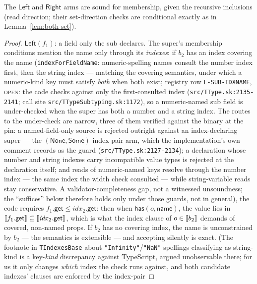 \documentclass[11pt]{article}
\begin{document}
\begin{lemma}
\label{lem:width}
The $\mathsf{Left}$ and $\mathsf{Right}$ arms are sound for membership,
given the recursive inclusions (read direction; their set-direction
checks are conditional exactly as in Lemma~\ref{lem:both-set}).
\end{lemma}
\begin{proof}
$\mathsf{Left}(f_1)$: a field only the sub declares. The super's
membership conditions mention the name only through its \emph{indexes}:
if $b_2$ has an index covering the name
(\texttt{indexForFieldName}: numeric-spelling names consult the number
index first, then the string index --- matching the covering semantics,
under which a numeric-kind key must satisfy \emph{both} when both exist;
registry row \texttt{L-SUB-IDXNAME}, \textsc{open}: the code checks
against only the first-consulted index
(\texttt{src/TType.sk:2135-2141}; call site
\texttt{src/TTypeSubtyping.sk:1172}), so a numeric-named sub field is
under-checked when the super has both a number and a string index. The
routes to the under-check are narrow, three of them verified against
the binary at the pin: a named-field-only source is rejected outright
against an index-declaring super --- the
$(\mathsf{None},\mathsf{Some})$ index-pair arm, which the
implementation's own comment records as the guard
(\texttt{src/TType.sk:2127-2134}); a declaration whose number and
string indexes carry incompatible value types is rejected at the
declaration itself; and reads of numeric-named keys resolve through the
number index --- the same index the width check consulted --- while
string-variable reads stay conservative. A validator-completeness gap,
not a witnessed unsoundness; the ``suffices''
below therefore holds only under those guards, not in general), the code
requires
$f_1.\mathsf{get} \leq \mathit{idx}_2.\mathsf{get}$: then when
$\mathsf{has}(o, \mathsf{name})$, the value lies in
$\llbracket f_1.\mathsf{get} \rrbracket \subseteq \llbracket \mathit{idx}_2.\mathsf{get} \rrbracket$,
which is what the index clause of $o \in \llbracket b_2 \rrbracket$ demands of covered,
non-named props. If $b_2$ has no covering index, the name is
unconstrained by $b_2$ --- the semantics is extensible --- and accepting
silently is exact. (The footnote in \texttt{TIndexesBase} about
\texttt{"Infinity"}/\texttt{"NaN"} spellings classifying as string-kind
is a key-\emph{kind} discrepancy against TypeScript, argued unobservable
there; for us it only changes \emph{which} index the check runs against,
and both candidate indexes' clauses are enforced by the index-pair

\end{proof}
\end{document}
